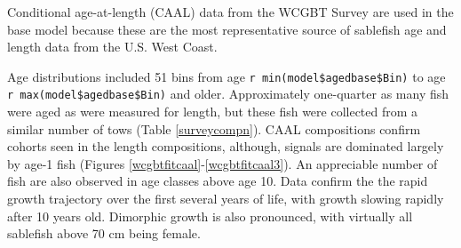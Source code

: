 \documentclass[11pt,
  english,
  a4paper,
]{article}
\begin{document}

Conditional age-at-length (CAAL) data from the WCGBT Survey are used in the base model because these are the most representative source of sablefish age and length data from the U.S. West Coast.

\leavevmode\tagmcend\tagstructend\par


Age distributions included 51 bins from age \texttt{r\ min(model\$agedbase\$Bin)} to age \texttt{r\ max(model\$agedbase\$Bin)} and older. Approximately one-quarter as many fish were aged as were measured for length, but these fish were collected from a similar number of tows (Table \ref{surveycompn}). CAAL compositions confirm cohorts seen in the length compositions, although, signals are dominated largely by age-1 fish (Figures \ref{wcgbtfitcaal}-\ref{wcgbtfitcaal3}). An appreciable number of fish are also observed in age classes above age 10. Data confirm the the rapid growth trajectory over the first several years of life, with growth slowing rapidly after 10 years old. Dimorphic growth is also pronounced, with virtually all sablefish above 70 cm being female.

\leavevmode\tagmcend\tagstructend\par
\end{document}
